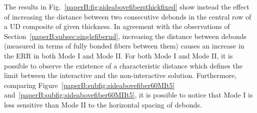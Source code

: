 The results in Fig.~\ref{paperB:fig:sideabovefibersthickfixed} show instead the effect of increasing the distance between two consecutive debonds in the central row of a UD composite of given thickness. In agreement with the observations of Section~\ref{paperB:subsec:singlefiberud}, increasing the distance between debonds (measured in terms of fully bonded fibers between them) causes an increase in the ERR in both Mode I and Mode II. For both Mode I and Mode II, it is possible to observe the existence of a characteristic distance which defines the limit between the interactive and the non-interactive solution. Furthermore, comparing Figure~\ref{paperB:subfig:sideabovefiber60MIt5} and~\ref{paperB:subfig:sideabovefiber60MIIt5}, it is possible to notice that Mode I is less sensitive than Mode II to the horizontal spacing of debonds.


